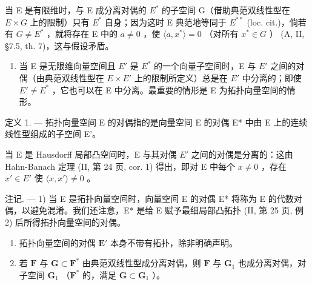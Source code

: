 当 E 是有限维时，与 E 成分离对偶的 \(E^{*}\) 的子空间 G（借助典范双线性型在 \(E \times G\) 上的限制）只有 \(E^{*}\) 自身；因为这时 E 典范地等同于 \(E^{**}\) (loc. cit.)，倘若有 \(G \neq E^{*}\) ，就将存在 E 中的 \(a \neq 0\) ，使 \(\langle a, x^{*} \rangle = 0\) （对所有 \(x^{*} \in G\) ） (A, II, §7.5, th. 7)，这与假设矛盾。

\begin{enumerate}
\def\labelenumi{\arabic{enumi})}
\setcounter{enumi}{1}
\tightlist
\item
  当 E 是无限维向量空间且 \(E'\) 是 \(E^{*}\) 的一个向量子空间时，E 与 \(E'\) 之间的对偶（由典范双线性型在 \(E \times E'\) 上的限制所定义）总是在 \(E'\) 中分离的；即使 \(E' \neq E^{*}\) ，它也可以在 E 中分离。最重要的情形是 E 为拓扑向量空间的情形。
\end{enumerate}

定义 1. --- 拓扑向量空间 E 的对偶指的是向量空间 E 的对偶 E* 中由 E 上的连续线性型组成的子空间 E'。

当 E 是 Hausdorff 局部凸空间时，E 与其对偶 \(E'\) 之间的对偶是分离的：这由 Hahn-Banach 定理 (II, 第 24 页, cor. 1) 得出，即对 E 中每个 \(x \neq 0\) ，存在 \(x' \in E'\) 使 \(\langle x, x' \rangle \neq 0\) 。

注记. --- 1) 当 E 是拓扑向量空间时，向量空间 E 的对偶 E* 将称为 E 的代数对偶，以避免混淆。我们还注意，E* 是给 E 赋予最细局部凸拓扑 (II, 第 25 页, 例 2) 后所得拓扑向量空间的对偶。

\begin{enumerate}
\def\labelenumi{\arabic{enumi})}
\setcounter{enumi}{1}
\item
  拓扑向量空间的对偶 \(\mathbf{E}'\) 本身不带有拓扑，除非明确声明。
\item
  若 \(\mathbf{F}\) 与 \(\mathbf{G} \subset \mathbf{F}^*\) 由典范双线性型成分离对偶，则 \(\mathbf{F}\) 与 \(\mathbf{G}_1\) 也成分离对偶，对子空间 \(\mathbf{G}_1\) （\(\mathbf{F}^*\) 的，满足 \(\mathbf{G} \subset \mathbf{G}_1\) ）。
\end{enumerate}

